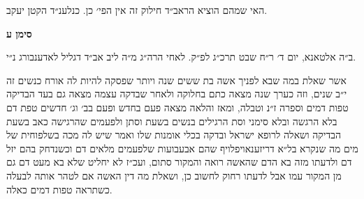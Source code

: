 \documentclass[12pt, openany]{book}
\newcommand{\chapname}{}
\newcommand{\newchap}[1]{
	\addcontentsline{toc}{chapter}{#1}
	\renewcommand{\chapname}{#1}
		\begin{center}
			\textbf{%
\fontsize{16pt}{16pt}\selectfont
				#1}
		\end{center}
}
\begin{document}
\begin{multicols}{2}
האי שמהם הוציא הראב״ד חילוק זה אין הפי׳ כן. כנלענ״ד הקטן יעקב.\\\vspace{0pt}

\end{multicols}\newpage

\newchap{סימן ע}
\begin{multicols}{2}
ב״ה אלטאנא, יום ד׳ ר״ח שבט תרכ״ג לפ״ק. לאחי הרה״ג מ״ה ליב אב״ד דגליל לאדענבורג נ״י.\\\vspace{0pt}

אשר שאלת במה שבא לפניך אשה בת ששים שנה ויותר שפסקה להיות לה אורח כנשים זה י״ב שנים, וזה כערך שנה מצאה כתם בחלוקה ולאחר שבדקה עצמה מצאה גם בעד הבדיקה טפות דמים וספרה ז״נ וטבלה, ומאז והלאה מצאה פעם בחדש ופעם בב׳ וג׳ חדשים טפת דם בלא הרגשה ובלא סימני וסת הרגילים בנשים בשעת וסתן ולפעמים שהרגישה כאב בשעת הבדיקה ושאלה לרופא ישראל ובדקה בכלי אומנות שלו ואמר שיש לה מכה בשלפוחית של מים מה שנקרא בל״א דריזענאויפלויף שהם אבעבועות שלפעמים מלאים דם וכשנדחק בהם יזל דם ולדעתו מזה בא הדם שהאשה רואה והמקור סתום, ועכ״ז לא יחליט שלא בא מעט דם גם מן המקור עמו אבל לדעתו רחוק לחשוב כן, ושאלת מה דין האשה אם לטהר אותה לבעלה כשתראה טפות דמים כאלה.\\\vspace{0pt}


\end{multicols}
\end{document}
